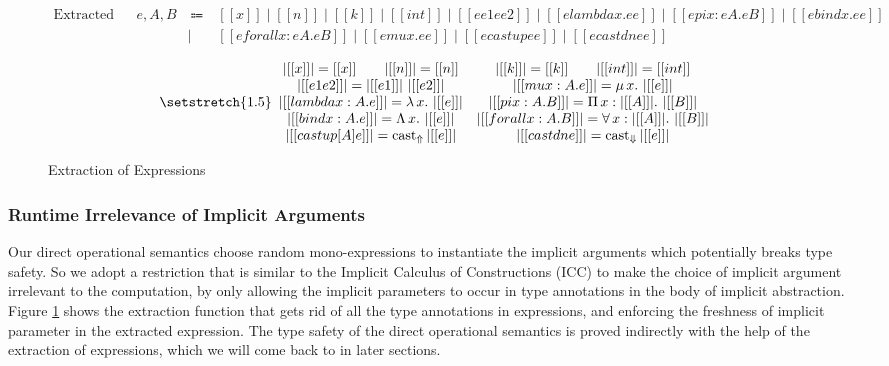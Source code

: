 \documentclass{llncs}
\newcommand{\extract}[1]{\lvert #1 \rvert}
\newcommand{\castup}[0]{\mathrm{cast}_\Uparrow}
\newcommand{\castdn}[0]{\mathrm{cast}_\Downarrow}
\begin{document}
\begin{figure}
    \centering
    \begin{equation*}
        \begin{array}{llcl}
            \text{Extracted Expressions} & e, A, B & ~ \Coloneqq ~ & [[x]] \mid [[n]] \mid [[k]] \mid [[int]] \mid [[ee1 ee2]] \mid [[elambda x. ee]] \mid [[epi x : eA. eB]] \mid [[ebind x. ee]] \\
            & & \mid & [[eforall x : eA. eB]] \mid [[emu x. ee]] \mid [[ecastup ee]] \mid [[ecastdn ee]]
        \end{array}
    \end{equation*}

    \begin{equation*}
    {\setstretch{1.5}
    \begin{array}{cc}
        \extract{[[x]]} = [[x]] \qquad
        \extract{[[n]]} = [[n]] &
        \extract{[[k]]} = [[k]] \qquad
        \extract{[[int]]} = [[int]] \\
        \extract{[[e1 e2]]} = \extract{[[e1]]} ~ \extract{[[e2]]} &
        \extract{[[mu x : A. e]]} = \mu \, x. ~ \extract{[[e]]} \\
        \extract{[[lambda x : A. e]]} = \lambda \, x. ~ \extract{[[e]]} &
        \extract{[[pi x : A. B]]} = \Pi \, x : \extract{[[A]]}. ~ \extract{[[B]]} \\
        \extract{[[bind x : A. e]]} = \Lambda \, x. ~ \extract{[[e]]} &
        \extract{[[forall x : A. B]]} = \forall \, x : \extract{[[A]]}. ~ \extract{[[B]]} \\
        \extract{[[castup [A] e]]} = \castup \, \extract{[[e]]} &
        \extract{[[castdn e]]} = \castdn \, \extract{[[e]]}
    \end{array}
    }
    \end{equation*}

    \caption{Extraction of Expressions}
    \label{fig:extraction}
\end{figure}

\subsubsection{Runtime Irrelevance of Implicit Arguments}

Our direct operational semantics choose random mono-expressions to instantiate
the implicit arguments which potentially breaks type safety. So we adopt a
restriction that is similar to the Implicit Calculus of Constructions (ICC) \cite{miquel2001implicit}
to make the choice of implicit argument irrelevant to the computation, by only
allowing the implicit parameters to occur in type annotations in the body of
implicit abstraction. Figure \ref{fig:extraction} shows the extraction function
that gets rid of all the type annotations in expressions, and enforcing the
freshness of implicit parameter in the extracted expression. The type safety of
the direct operational semantics is proved indirectly with the help of
the extraction of expressions, which we will come back to in later sections.
\end{document}
